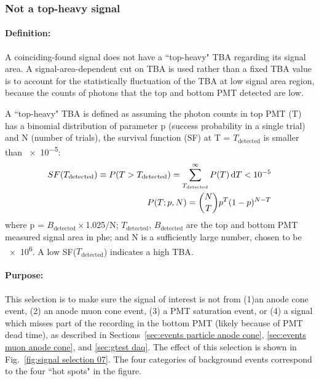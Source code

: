 \subsubsection{Not a top-heavy signal} %
\label{sec:cuts top heavy}	
\paragraph{Definition:}
A coinciding-found signal does not have a ``top-heavy" TBA regarding its signal area. A signal-area-dependent cut on TBA is used rather than a fixed TBA value is to account for the statistically fluctuation of the TBA at low signal area region, because the counts of photons that the top and bottom PMT detected are low. 

A ``top-heavy" TBA is defined as assuming the photon counts in top PMT (T) has a binomial distribution of parameter p (success probability in a single trial) and N (number of trials), the survival function (SF) at T = $T_{\text{detected}}$ is smaller than \num{e-5}:
\begin{align}
	SF (T_{\text{detected}}) \equiv P(T > T_{\text{detected}}) = \sum_{T_{\text{detected}}}^{\infty} P (T) \operatorname{d}\!{T}< \num{e-5} \\
	P (T; p, N) = \binom{N}{T} p^{T} (1-p)^{N-T}
\end{align}    
where p = $B_{\text{detected}} \times$\num{1.025}/N; $T_{\text{detected}}$, $B_{\text{detected}}$ are the top and bottom PMT measured signal area in \si{phe}; and N is a sufficiently large number, chosen to be \num{e6}. A low SF($T_{\text{detected}}$) indicates a high TBA. 

\paragraph{Purpose:}
This selection is to make sure the signal of interest is not from (1)an anode cone event, (2) an anode muon cone event, (3) a PMT saturation event, or (4) a signal which misses part of the recording in the bottom PMT (likely because of PMT dead time), as described in Sections~\ref{sec:events particle anode cone}, \ref{sec:events muon anode cone}, and \ref{sec:gtest daq}. The effect of this selection is shown in Fig.~\ref{fig:signal selection 07}. The four categories of background events correspond to the four ``hot spots" in the figure. 

